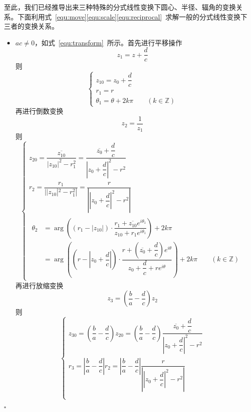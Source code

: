 \documentclass{article}
\newenvironment{SOLUTION}[1][{}]{{\noindent\heiti 解#1：}}{\hfill $\square$\par}
\begin{document}
\begin{SOLUTION}
\begin{enumerate}
    \end{enumerate}
    至此，我们已经推导出来三种特殊的分式线性变换下圆心、半径、辐角的变换关系。下面利用式~\eqref{equ:move}\eqref{equ:scale}\eqref{equ:reciprocal}~求解一般的分式线性变换下三者的变换关系。
    \begin{itemize}
        \item $ac\neq 0$，如式~\eqref{equ:transform}~所示。首先进行平移操作$$z_1=z+\frac{d}{c}$$则
    \begin{equation}
    \begin{cases}
    z_{10}=z_0+\dfrac{d}{c}\\
    r_1=r\\
    \theta_1=\theta+2k\pi\qquad (k\in \mathbb{Z})
    \end{cases}
    \end{equation}
    再进行倒数变换$$z_2=\dfrac{1}{z_1}$$
    则
    \begin{equation}
    \begin{cases}
    z_{20}=\dfrac{\overline{z_{10}}}{|z_{10}|^2-r_1^2}=\dfrac{\overline{z_0}+\dfrac{d}{c}}{\left|z_0+\dfrac{d}{c}\right|^2-r^2}
    \\[2ex]
    r_2=\dfrac{r_1}{||z_{10}|^2-r_1^2|}=\dfrac{r}{\left|\left|z_0+\dfrac{d}{c}\right|^2-r^2\right|}\\[3ex]
    \begin{split}
    \theta_2&=\arg \left((r_1-|z_{10}|)\cdot\dfrac{r_1+\overline{z_{10}}e^{i\theta_1}}{z_{10}+r_1e^{i\theta_1}}\right)+2k\pi\\[2ex]
    &=\arg \left(\left(r-\left|z_0+\dfrac{d}{c}\right|\right)\cdot\dfrac{r+\left(\overline{z_0}+\dfrac{d}{c}\right)e^{i\theta}}{z_0+\dfrac{d}{c}+re^{i\theta}}\right)+2k\pi\qquad (k\in \mathbb{Z})
    \end{split}
    \end{cases}
    \label{equ:move_rec}
    \end{equation}
    再进行放缩变换$$z_3=\left(\frac{b}{a}-\frac{d}{c}\right)z_2$$
    则
    \begin{equation}
    \begin{cases}
    z_{30}=\left(\dfrac{b}{a}-\dfrac{d}{c}\right)z_{20}=\left(\dfrac{b}{a}-\dfrac{d}{c}\right)\dfrac{\overline{z_0}+\dfrac{d}{c}}{\left|z_0+\dfrac{d}{c}\right|^2-r^2}\\[2ex]
    r_3=\left|\dfrac{b}{a}-\dfrac{d}{c}\right|r_2=\left|\dfrac{b}{a}-\dfrac{d}{c}\right|\dfrac{r}{\left|\left|z_0+\dfrac{d}{c}\right|^2-r^2\right|}\\[2ex]
    \begin{split}

\end{split}
\end{cases}
\end{equation}
\end{itemize}
\end{SOLUTION}
\end{document}
